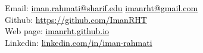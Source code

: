 { %
\noindent
\small \faEnvelope  \hspace{0.05cm}   Email: \href{mailto:iman.rahmati@sharif.edu}{\textcolor{black}{iman.rahmati@sharif.edu}} \space \href{mailto:imanrht@gmail.com}{\textcolor{black}{imanrht@gmail.com}} \\
\faGithub \hspace{0.1cm} Github: \href{https://github.com/ImanRHT}{\textcolor{black}{https://github.com/ImanRHT}}  \\
\faLink \hspace{0.05cm} Web page: \href{https://imanrht.github.io}{\textcolor{black}{imanrht.github.io}} \\
\faLinkedin \hspace{0.1cm} Linkedin: \href{https://linkedin.com/in/iman-rahmati}{\textcolor{black}{linkedin.com/in/iman-rahmati}}\\



}
